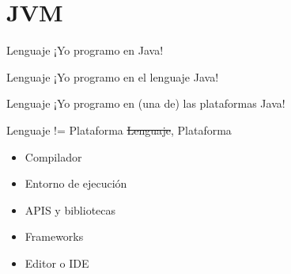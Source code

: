 \documentclass[aspectratio=169]{beamer}
\begin{document}
\section{JVM}



\begin{frame}{Lenguaje}
    ¡Yo programo en Java!
\end{frame}

\begin{frame}{Lenguaje}
    ¡Yo programo en el lenguaje Java!
\end{frame}


\begin{frame}{Lenguaje}
    ¡Yo programo en (una de) las plataformas Java!
\end{frame}


\begin{frame}{Lenguaje != Plataforma}
    \sout{Lenguaje}, Plataforma
	\begin{itemize}
	\item Compilador
    \item Entorno de ejecución
    \item APIS y bibliotecas
    \item Frameworks
    \item Editor o IDE
	\end{itemize}
\end{frame}
\end{document}
